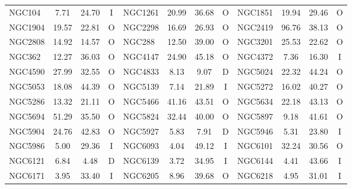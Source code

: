 \begin{table}
\begin{tabular}{l | c | c | c | l | c | c | c | l | c | c | c}
                NGC104 &   7.71 &  24.70 &              I &
                NGC1261 &  20.99 &  36.68 &              O &
                NGC1851 &  19.94 &  29.46 &              O \\
                NGC1904 &  19.57 &  22.81 &              O &
                NGC2298 &  16.69 &  26.93 &              O &
                NGC2419 &  96.76 &  38.13 &              O \\
                NGC2808 &  14.92 &  14.57 &              O &
                NGC288 &  12.50 &  39.00 &              O &
                NGC3201 &  25.53 &  22.62 &              O \\
                NGC362 &  12.27 &  36.03 &              O &
                NGC4147 &  24.90 &  45.18 &              O &
                NGC4372 &   7.36 &  16.30 &              I \\
                NGC4590 &  27.99 &  32.55 &              O &
                NGC4833 &   8.13 &   9.07 &              D &
                NGC5024 &  22.32 &  44.24 &              O \\
                NGC5053 &  18.08 &  44.39 &              O &
                NGC5139 &   7.14 &  21.89 &              I &
                NGC5272 &  16.02 &  40.27 &              O \\
                NGC5286 &  13.32 &  21.11 &              O &
                NGC5466 &  41.16 &  43.51 &              O &
                NGC5634 &  22.18 &  43.13 &              O \\
                NGC5694 &  51.29 &  35.50 &              O &
                NGC5824 &  32.44 &  40.00 &              O &
                NGC5897 &   9.18 &  41.61 &              O \\
                NGC5904 &  24.76 &  42.83 &              O &
                NGC5927 &   5.83 &   7.91 &              D &
                NGC5946 &   5.31 &  23.80 &              I \\
                NGC5986 &   5.00 &  29.36 &              I &
                NGC6093 &   4.04 &  49.12 &              I &
                NGC6101 &  32.24 &  30.56 &              O \\
                NGC6121 &   6.84 &   4.48 &              D &
                NGC6139 &   3.72 &  34.95 &              I &
                NGC6144 &   4.41 &  43.66 &              I \\
                NGC6171 &   3.95 &  33.40 &              I &
                NGC6205 &   8.96 &  39.68 &              O &
                NGC6218 &   4.95 &  31.01 &              I \\

\end{tabular}
\end{table}
